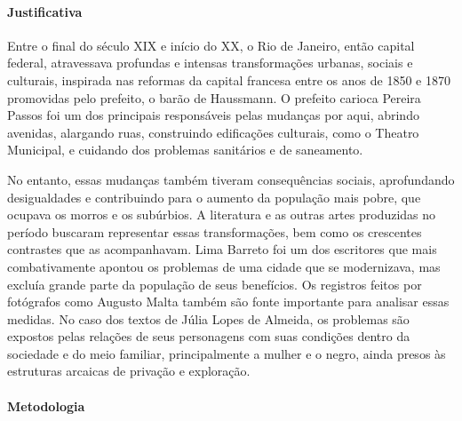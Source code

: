 \documentclass[12pt]{extarticle}
\begin{document}
\paragraph{Justificativa} Entre o final do século \textsc{XIX} e início do \textsc{XX}, o
Rio de Janeiro, então capital federal, atravessava profundas e intensas
transformações urbanas, sociais e culturais, inspirada nas reformas da
capital francesa entre os anos de 1850 e 1870 promovidas pelo prefeito,
o barão de Haussmann. O prefeito carioca Pereira Passos foi um dos
principais responsáveis pelas mudanças por aqui, abrindo avenidas,
alargando ruas, construindo edificações culturais, como o Theatro
Municipal, e cuidando dos problemas sanitários e de saneamento.








No entanto, essas mudanças também tiveram consequências sociais,
aprofundando desigualdades e contribuindo para o aumento da população
mais pobre, que ocupava os morros e os subúrbios. A literatura e as
outras artes produzidas no período buscaram representar essas
transformações, bem como os crescentes contrastes que as
acompanhavam. Lima Barreto foi um dos escritores que mais combativamente
apontou os problemas de uma cidade que se modernizava, mas excluía
grande parte da população de seus benefícios. Os registros feitos por
fotógrafos como Augusto Malta também são fonte importante para analisar
essas medidas. No caso dos textos de Júlia Lopes de Almeida, os
problemas são expostos pelas relações de seus personagens com suas
condições dentro da sociedade e do meio familiar, principalmente a
mulher e o negro, ainda presos às estruturas arcaicas de privação e
exploração.

\paragraph{Metodologia} 


\end{document}
